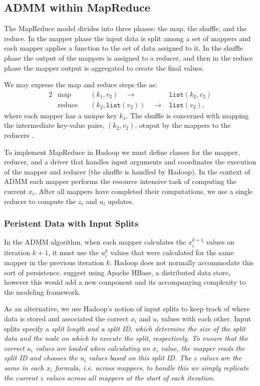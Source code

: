 \documentclass[10pt, conference, compsocconf]{IEEEtran}
\begin{document}
\subsection{ADMM within MapReduce}
The MapReduce model divides into three phases: the map, the shuffle, and the reduce.  In the mapper phase the input data is split among a set of mappers and each mapper applies a function to the set of data assigned to it.  In the shuffle phase the output of the mappers is assigned to a reducer, and then in the reduce phase the mapper output is aggregated to create the final values.

We may express the map and reduce steps the as:
\begin{alignat*}{2}
&\text{map}\quad &(k_1,v_2)\quad\rightarrow &\texttt{list}(k_2,v_2)\\
&\text{reduce}\quad &(k_2,\texttt{list}(v_2))\quad\rightarrow &\texttt{list}(v_2),
\end{alignat*}
where each mapper has a unique key $k_1$.  The shuffle is concerned with mapping the intermediate key-value pairs, $(k_2,v_2)$, otuput by the mappers to the reducers \cite{dean2004}.

To implement MapReduce in Hadoop we must define classes for the mapper, reducer, and a driver that handles input arguments and coordinates the execution of the mapper and reducer (the shuffle is handled by Hadoop).  In the context of ADMM each mapper performs the resource intensive task of computing the current $x_i$.  After all mappers have completed their computations, we use a single reducer to compute the $z_i$ and $u_i$ updates.

\subsubsection{Peristent Data with Input Splits}
In the ADMM algorithm, when each mapper calculates the $x_i^{k+1}$ values on iteration $k+1$, it must use the $u_i^k$ values that were calculated for the same mapper in the previous iteration $k$.  Hadoop does not normally accommodate this sort of persistence.  \cite{boyd} suggest using Apache HBase, a distributed data store, however this would add a new component and its accompanying complexity to the modeling framework.

As an alternative, we use Hadoop's notion of input splits to keep track of where data is stored and associated the correct $x_i$ and $u_i$ values with each other.  Input splits specify a \em{split length} and a \em{split ID}, which determine the size of the split data and the node on which to execute the split, respectively.  To ensure that the correct $u_i$ values are loaded when calculating an $x_i$ value, the mapper reads the split ID and chooses the $u_i$ values based on this split ID.  The $z$ values are the same in each $x_i$ formula, i.e. across mappers, to handle this we simply replicate the current $z$ values across all mappers at the start of each iteration.
\end{document}
